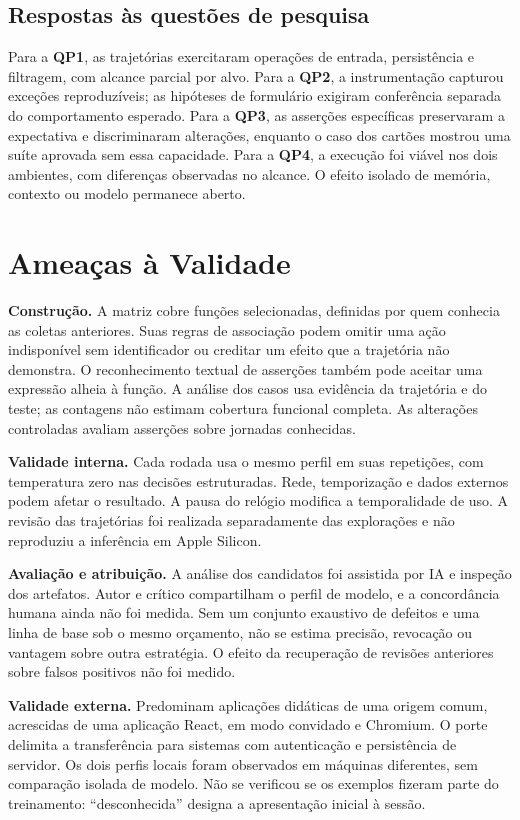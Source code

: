 \documentclass[12pt]{article}
\begin{document}
\subsection{Respostas às questões de pesquisa}
Para a \textbf{QP1}, as trajetórias exercitaram operações de entrada, persistência e filtragem, com alcance parcial por alvo. Para a \textbf{QP2}, a instrumentação capturou exceções reproduzíveis; as hipóteses de formulário exigiram conferência separada do comportamento esperado. Para a \textbf{QP3}, as asserções específicas preservaram a expectativa e discriminaram alterações, enquanto o caso dos cartões mostrou uma suíte aprovada sem essa capacidade. Para a \textbf{QP4}, a execução foi viável nos dois ambientes, com diferenças observadas no alcance. O efeito isolado de memória, contexto ou modelo permanece aberto.


\section{Ameaças à Validade}\label{sec:threats}
\textbf{Construção.} A matriz cobre funções selecionadas, definidas por quem conhecia as coletas anteriores. Suas regras de associação podem omitir uma ação indisponível sem identificador ou creditar um efeito que a trajetória não demonstra. O reconhecimento textual de asserções também pode aceitar uma expressão alheia à função. A análise dos casos usa evidência da trajetória e do teste; as contagens não estimam cobertura funcional completa. As alterações controladas avaliam asserções sobre jornadas conhecidas.

\textbf{Validade interna.} Cada rodada usa o mesmo perfil em suas repetições, com temperatura zero nas decisões estruturadas. Rede, temporização e dados externos podem afetar o resultado. A pausa do relógio modifica a temporalidade de uso. A revisão das trajetórias foi realizada separadamente das explorações e não reproduziu a inferência em Apple Silicon.

\textbf{Avaliação e atribuição.} A análise dos candidatos foi assistida por IA e inspeção dos artefatos. Autor e crítico compartilham o perfil de modelo, e a concordância humana ainda não foi medida. Sem um conjunto exaustivo de defeitos e uma linha de base sob o mesmo orçamento, não se estima precisão, revocação ou vantagem sobre outra estratégia. O efeito da recuperação de revisões anteriores sobre falsos positivos não foi medido.

\textbf{Validade externa.} Predominam aplicações didáticas de uma origem comum, acrescidas de uma aplicação React, em modo convidado e Chromium. O porte delimita a transferência para sistemas com autenticação e persistência de servidor. Os dois perfis locais foram observados em máquinas diferentes, sem comparação isolada de modelo. Não se verificou se os exemplos fizeram parte do treinamento: ``desconhecida'' designa a apresentação inicial à sessão.
\end{document}
